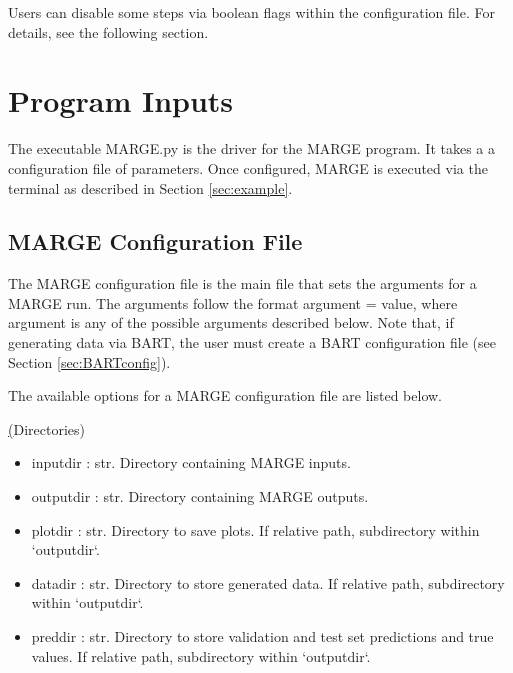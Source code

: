 \documentclass[letterpaper, 12pt]{article}
\begin{document}
\noindent Users can disable some steps via boolean flags within the configuration file.  
For details, see the following section.


\section{Program Inputs}
\label{sec:inputs}

The executable MARGE.py is the driver for the MARGE program. It takes a 
a configuration file of parameters.  Once configured, MARGE is executed via 
the terminal as described in Section \ref{sec:example}.


\subsection{MARGE Configuration File}
\label{sec:config}
The MARGE configuration file is the main file that sets the arguments for a 
MARGE run. The arguments follow the format {\ttb argument = value}, where 
{\ttb argument} is any of the possible arguments described below. Note that, 
if generating data via BART, the user must create a BART configuration file 
(see Section \ref{sec:BARTconfig}).

\noindent The available options for a MARGE configuration file are listed below.

\noindent \underline(Directories)
\begin{itemize}
\item inputdir   : str.  Directory containing MARGE inputs.
\item outputdir  : str.  Directory containing MARGE outputs.
\item plotdir    : str.  Directory to save plots. 
                         If relative path, subdirectory within `outputdir`.
\item datadir    : str.  Directory to store generated data. 
                         If relative path, subdirectory within `outputdir`.
\item preddir    : str.  Directory to store validation and test set predictions and true values. 
                         If relative path, subdirectory within `outputdir`.
\end{itemize}
\end{document}
